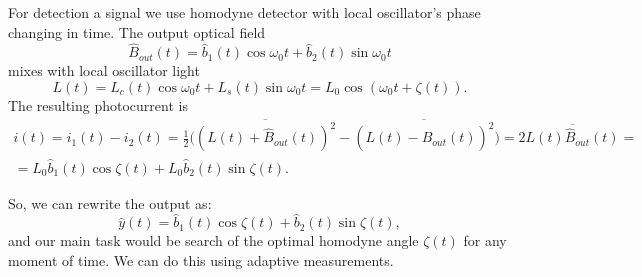 For detection a signal we use homodyne detector with local oscillator's phase changing in time. The output optical field
\begin{equation}
 \hat{B}_{out}(t) = \hat{b}_1(t)\cos \omega_0 t +  \hat{b}_2(t) \sin \omega_0 t
\end{equation}
mixes with local oscillator light
\begin{equation}
 L(t)=L_c(t)\cos \omega_0 t + L_s (t) \sin \omega_0 t = L_0 \cos (\omega_0 t + \zeta(t)).
\end{equation}
The resulting photocurrent is
\begin{multline}
 i(t) = i_1(t)-i_2(t) = \frac{1}{2}\bigl( \overline{(L(t)+\hat{B}_{out}(t))^2}- \overline{(L(t)-\hat{B}_{out}(t))^2}\bigr) = 2 \overline{L(t)\hat{B}_{out}(t)} =\\
=L_0 \hat{b}_1(t)\cos \zeta(t) +  L_0 \hat{b}_2(t) \sin \zeta(t).
\end{multline}

So, we can rewrite the output as:
\begin{equation}\label{gen_y}
 \hat{y}(t) = \hat{b}_1(t)\cos \zeta(t) +  \hat{b}_2(t) \sin \zeta(t),
\end{equation}
and our main task would be search of the optimal homodyne angle $\zeta(t)$ for any moment of time. We can do this using adaptive measurements.

